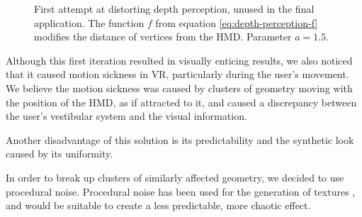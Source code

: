 \begin{figure}[H]
{            
        }
    \fi
    \caption{First attempt at distorting depth perception, unused in the final application. The function $f$ from equation \ref{eq:depth-perception-f} modifies the distance of vertices from the \ac{HMD}. Parameter $a = 1.5$.}\label{fig:depth-perception-f}
\end{figure}

Although this first iteration resulted in visually enticing results, we also noticed that it caused motion sickness in \ac{VR}, particularly during the user's movement. We believe the motion sickness was caused by clusters of geometry moving with the position of the \ac{HMD}, as if attracted to it, and caused a discrepancy between the user's vestibular system and the visual information.

Another disadvantage of this solution is its predictability and the synthetic look caused by its uniformity.

\label{sec:noise}
In order to break up clusters of similarly affected geometry, we decided to use procedural noise. Procedural noise has been used for the generation of textures \autocite{perlin1985image}, and would be suitable to create a less predictable, more chaotic effect.

